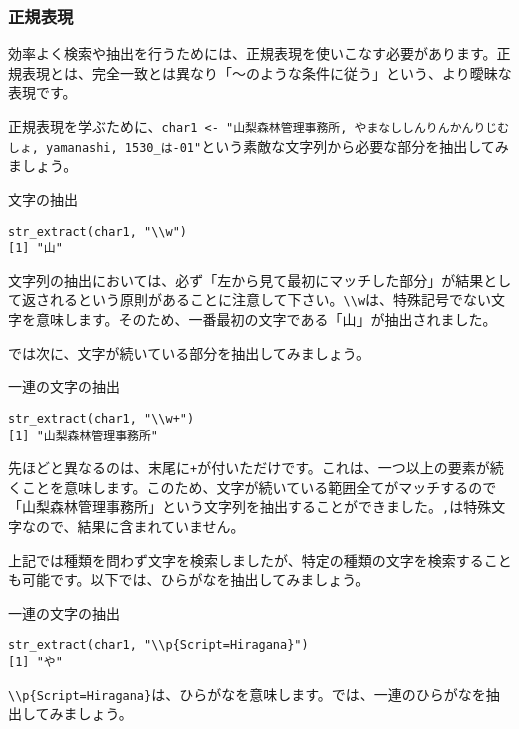     \subsubsection{正規表現}
効率よく検索や抽出を行うためには、正規表現を使いこなす必要があります。正規表現とは、完全一致とは異なり「〜のような条件に従う」という、より曖昧な表現です。

正規表現を学ぶために、\verb|char1 <- "山梨森林管理事務所, やまなししんりんかんりじむしょ, yamanashi, 1530_は-01"|という素敵な文字列から必要な部分を抽出してみましょう。
\begin{itembox}[l]{文字の抽出}
\begin{verbatim}
str_extract(char1, "\\w")
[1] "山"
\end{verbatim}
\end{itembox}

文字列の抽出においては、必ず「左から見て最初にマッチした部分」が結果として返されるという原則があることに注意して下さい。\verb|\\w|は、特殊記号でない文字を意味します。そのため、一番最初の文字である「山」が抽出されました。

では次に、文字が続いている部分を抽出してみましょう。
\begin{itembox}[l]{一連の文字の抽出}
\begin{verbatim}
str_extract(char1, "\\w+")
[1] "山梨森林管理事務所"
\end{verbatim}
\end{itembox}

先ほどと異なるのは、末尾に\verb|+|が付いただけです。これは、一つ以上の要素が続くことを意味します。このため、文字が続いている範囲全てがマッチするので「山梨森林管理事務所」という文字列を抽出することができました。\verb|,|は特殊文字なので、結果に含まれていません。

上記では種類を問わず文字を検索しましたが、特定の種類の文字を検索することも可能です。以下では、ひらがなを抽出してみましょう。
\begin{itembox}[l]{一連の文字の抽出}
\begin{verbatim}
str_extract(char1, "\\p{Script=Hiragana}")
[1] "や"
\end{verbatim}
\end{itembox}
\verb|\\p{Script=Hiragana}|は、ひらがなを意味します。では、一連のひらがなを抽出してみましょう。

